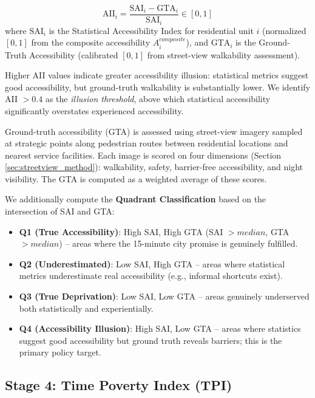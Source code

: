 \documentclass[preprint,12pt,authoryear]{elsarticle}
\begin{document}
\begin{equation}
\text{AII}_i = \frac{\text{SAI}_i - \text{GTA}_i}{\text{SAI}_i} \in [0, 1]
\label{eq:aii}
\end{equation}
where $\text{SAI}_i$ is the Statistical Accessibility Index for residential unit $i$ (normalized $[0,1]$ from the composite accessibility $A_i^{composite}$), and $\text{GTA}_i$ is the Ground-Truth Accessibility (calibrated $[0,1]$ from street-view walkability assessment).

Higher AII values indicate greater accessibility illusion: statistical metrics suggest good accessibility, but ground-truth walkability is substantially lower. We identify AII $> 0.4$ as the \emph{illusion threshold}, above which statistical accessibility significantly overstates experienced accessibility.

Ground-truth accessibility (GTA) is assessed using street-view imagery sampled at strategic points along pedestrian routes between residential locations and nearest service facilities. Each image is scored on four dimensions (Section \ref{sec:streetview_method}): walkability, safety, barrier-free accessibility, and night visibility. The GTA is computed as a weighted average of these scores.

We additionally compute the \textbf{Quadrant Classification} based on the intersection of SAI and GTA:
\begin{itemize}
    \item \textbf{Q1 (True Accessibility)}: High SAI, High GTA (SAI $> median$, GTA $> median$) -- areas where the 15-minute city promise is genuinely fulfilled.
    \item \textbf{Q2 (Underestimated)}: Low SAI, High GTA -- areas where statistical metrics underestimate real accessibility (e.g., informal shortcuts exist).
    \item \textbf{Q3 (True Deprivation)}: Low SAI, Low GTA -- areas genuinely underserved both statistically and experientially.
    \item \textbf{Q4 (Accessibility Illusion)}: High SAI, Low GTA -- areas where statistics suggest good accessibility but ground truth reveals barriers; this is the primary policy target.
\end{itemize}

\subsection{Stage 4: Time Poverty Index (TPI)}
\label{sec:tpi}
\end{document}
